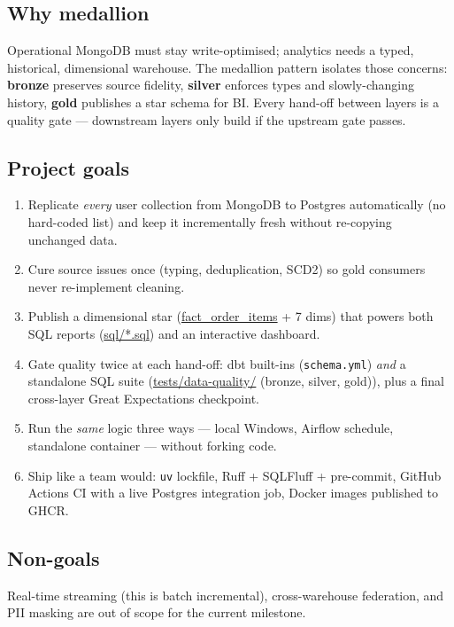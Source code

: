 \documentclass[11pt,a4paper]{article}
\begin{document}
\subsection{Why medallion}
Operational MongoDB must stay write-optimised; analytics needs a typed, historical, dimensional warehouse. The medallion pattern isolates those concerns: \textbf{bronze} preserves source fidelity, \textbf{silver} enforces types and slowly-changing history, \textbf{gold} publishes a star schema for BI. Every hand-off between layers is a quality gate — downstream layers only build if the upstream gate passes.

\subsection{Project goals}
\begin{enumerate}[leftmargin=1.4em,itemsep=2pt]
  \item Replicate \emph{every} user collection from MongoDB to Postgres automatically (no hard-coded list) and keep it incrementally fresh without re-copying unchanged data.
  \item Cure source issues once (typing, deduplication, SCD2) so gold consumers never re-implement cleaning.
  \item Publish a dimensional star (\url{fact_order_items} + 7 dims) that powers both SQL reports (\url{sql/*.sql}) and an interactive dashboard.
  \item Gate quality twice at each hand-off: dbt built-ins (\texttt{schema.yml}) \emph{and} a standalone SQL suite (\url{tests/data-quality/} (bronze, silver, gold)), plus a final cross-layer Great Expectations checkpoint.
  \item Run the \emph{same} logic three ways — local Windows, Airflow schedule, standalone container — without forking code.
  \item Ship like a team would: \texttt{uv} lockfile, Ruff + SQLFluff + pre-commit, GitHub Actions CI with a live Postgres integration job, Docker images published to GHCR.
\end{enumerate}

\subsection{Non-goals}
Real-time streaming (this is batch incremental), cross-warehouse federation, and PII masking are out of scope for the current milestone.

\end{document}
